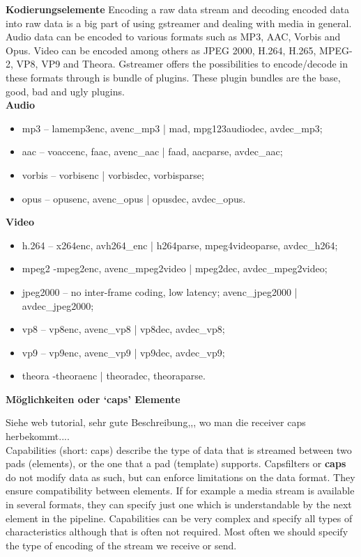 \color{red}
\textbf{Kodierungselemente}
Encoding a raw data stream and decoding encoded data into raw data is a big part of using gstreamer and dealing with media in general. Audio data can be encoded to various formats such as MP3, AAC, Vorbis and Opus. Video can be encoded among others as JPEG 2000, H.264, H.265, MPEG-2, VP8, VP9 and Theora. Gstreamer offers the possibilities to encode/decode in these formats through is bundle of plugins. These plugin bundles are the base, good, bad and ugly plugins.\\
\color{black}
\textbf{Audio}
\begin{itemize}
\item mp3 – lamemp3enc, avenc\_mp3 | mad, mpg123audiodec, avdec\_mp3; 
\item aac – voaccenc, faac, avenc\_aac | faad, aacparse, avdec\_aac;
\item vorbis – vorbisenc | vorbisdec, vorbisparse;
\item opus – opusenc, avenc\_opus | opusdec, avdec\_opus.
\end{itemize}

\textbf{Video}
\begin{itemize}
\item h.264 – x264enc, avh264\_enc |  h264parse, mpeg4videoparse, avdec\_h264;
\item mpeg2 -mpeg2enc, avenc\_mpeg2video | mpeg2dec, avdec\_mpeg2video;
\item jpeg2000 – no inter-frame coding, low latency; avenc\_jpeg2000 | avdec\_jpeg2000;
\item vp8 – vp8enc, avenc\_vp8 | vp8dec, avdec\_vp8;
\item vp9 – vp9enc, avenc\_vp9 | vp9dec, avdec\_vp9;
\item theora -theoraenc | theoradec, theoraparse.
\end{itemize}

\color{red}
\textbf{Möglichkeiten oder ‘caps’ Elemente}

Siehe web tutorial, sehr gute Beschreibung,,, wo man die receiver caps herbekommt....\\

Capabilities (short: caps) describe the type of data that is streamed between two pads (elements), or the one that a pad (template) supports. Capsfilters or \textbf{caps} do not modify data as such, but can enforce limitations on the data format. They ensure compatibility between elements. If for example a media stream is available in several formats, they can specify just one which is understandable by the next element in the pipeline. Capabilities can be very complex and specify all types of characteristics although that is often not required. Most often we should specify the type of encoding of the stream we receive or send.\\


